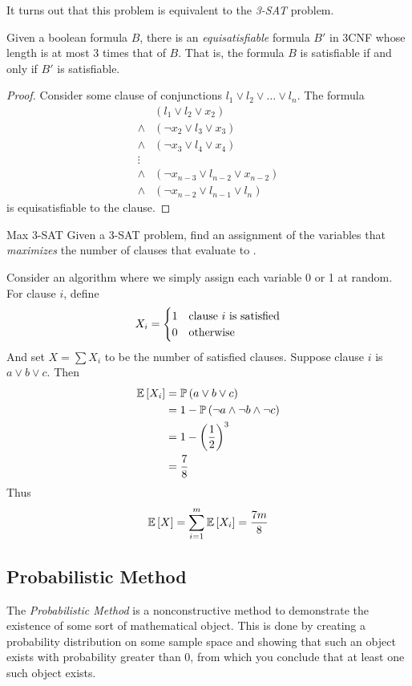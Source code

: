 It turns out that this problem is equivalent to the \emph{3-SAT} problem.
\begin{theorem}{}{}
    Given a boolean formula $B$, there is an \emph{equisatisfiable} formula $B'$
    in 3CNF whose length is at most 3 times that of $B$. That is, the formula
    $B$ is satisfiable if and only if $B'$ is satisfiable.  
\end{theorem}
\begin{proof}
    Consider some clause of conjunctions $l_1 \lor l_2 \lor \dots \lor l_n$.
    The formula
    \begin{align*}
              & (l_1 \lor l_2 \lor x_2)\\
        \land & (\neg x_2 \lor l_3 \lor x_3)\\
        \land & (\neg x_3 \lor l_4 \lor x_4)\\
        \vdots &\\
        \land & (\neg x_{n-3} \lor l_{n-2} \lor x_{n-2})\\
        \land & (\neg x_{n-2} \lor l_{n-1} \lor l_n)
    \end{align*}
    is equisatisfiable to the clause.
\end{proof}

\begin{problem}{Max 3-SAT}{}
    Given a 3-SAT problem, find an assignment of the variables that
    \emph{maximizes} the number of clauses that evaluate to \True.
\end{problem}

Consider an algorithm where we simply assign each variable 0 or 1 at random. For
clause $i$, define
\[X_i = \begin{cases}1 & \hbox{clause $i$ is satisfied}\\
                     0 & \hbox{otherwise}\end{cases}\]
And set $X = \sum X_i$ to be the number of satisfied clauses. Suppose clause $i$
is $a \lor b \lor c$. Then
\begin{align*}\operatorname{\mathbb{E}}\left[X_i\right]
    &= \operatorname{\mathbb{P}}\left(a \lor b \lor c\right)\\
    &= 1 - \operatorname{\mathbb{P}}\left(\neg a \land \neg b \land \neg c\right)\\
    &= 1 - \left(\frac{1}{2}\right)^3\\
    &= \frac{7}{8}
\end{align*}
Thus
\[\operatorname{\mathbb{E}}\left[X\right] = \sum_{i=1}^m \operatorname{\mathbb{E}}\left[X_i\right] = \frac{7m}{8}\]

\subsection{Probabilistic Method}
The \emph{Probabilistic Method} is a nonconstructive method to demonstrate the
existence of some sort of mathematical object. This is done by creating a
probability distribution on some sample space and showing that such an object
exists with probability greater than 0, from which you conclude that at least
one such object exists.

